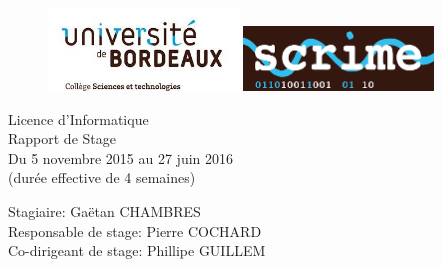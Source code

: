 \documentclass[a4paper, 12pt]{report}
\begin{document}
\begin{titlepage}

\begin{figure}[t]
\begin{center}
\includegraphics[width=0.45\textwidth]{ub.png}
\includegraphics[width=0.45\textwidth]{scrime.png}
\end{center}
\vspace{1cm}
\end{figure}

\begin{center}
{\LARGE Licence d'Informatique\\Rapport de Stage\\Du 5 novembre 2015 au 27 juin 2016\\ (durée effective de 4 semaines)}
\end{center}

\begin{center}
\vspace{1.4cm}
\end{center}
\vspace{1.4cm}

\begin{description}
\item[{\LARGE Stagiaire:}{ Gaëtan CHAMBRES}]
\item[{\LARGE Responsable de stage:}{ Pierre COCHARD}]
\vspace{0.5cm}
\item[{\LARGE Co-dirigeant de stage:}{ Phillipe GUILLEM}]
\end{description}


\end{titlepage}
\end{document}
